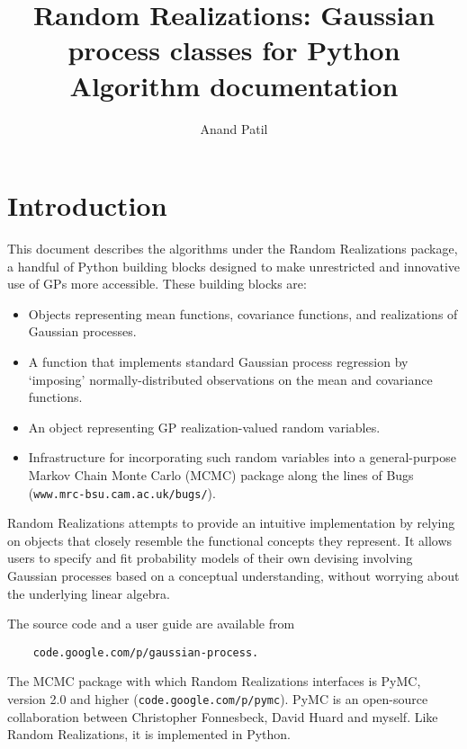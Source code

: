 \documentclass{report}
\begin{document}
\title{Random Realizations: Gaussian process classes for Python\\
Algorithm documentation}
\author{Anand Patil}
\maketitle
\tableofcontents

\chapter{Introduction}\label{cha:introduction} %

This document describes the algorithms under the Random Realizations package, a handful of Python building blocks designed to make unrestricted and innovative use of GPs more accessible. These building blocks are:
\begin{itemize}
    \item Objects representing mean functions, covariance functions, and realizations of Gaussian processes.
    \item A function that implements standard Gaussian process regression by `imposing' normally-distributed observations on the mean and covariance functions.
    \item An object representing GP realization-valued random variables.
    \item Infrastructure for incorporating such random variables into a general-purpose Markov Chain Monte Carlo (MCMC) \cite{gelman} package along the lines of Bugs \linebreak (\texttt{www.mrc-bsu.cam.ac.uk/bugs/}).
\end{itemize}
Random Realizations attempts to provide an intuitive implementation by relying on objects that closely resemble the functional concepts they represent. It allows users to specify and fit probability models of their own devising involving Gaussian processes based on a conceptual understanding, without worrying about the underlying linear algebra.

The source code and a user guide are available from
\begin{verbatim}
    code.google.com/p/gaussian-process.
\end{verbatim}

The MCMC package with which Random Realizations interfaces is PyMC, version 2.0 and higher (\texttt{code.google.com/p/pymc}). PyMC is an open-source collaboration between Christopher Fonnesbeck, David Huard and myself. Like Random Realizations, it is implemented in Python.
\end{document}
